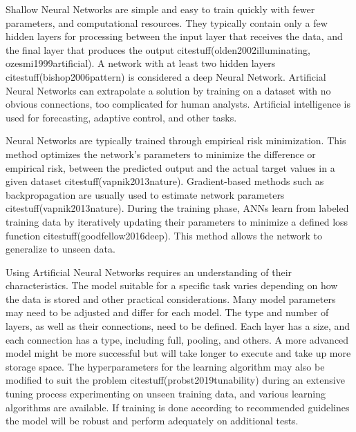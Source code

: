 \documentclass[preprint,12pt]{elsarticle}
\begin{document}
Shallow Neural Networks are simple and easy to train quickly with fewer parameters, and computational resources. They typically contain only a few hidden layers for processing between the input layer that receives the data, and the final layer that produces the output citestuff(olden2002illuminating, ozesmi1999artificial).  A network with at least two hidden layers citestuff(bishop2006pattern) is considered a deep Neural Network. Artificial Neural Networks can extrapolate a solution by training on a dataset with no obvious connections, too complicated for human analysts. Artificial intelligence is used for forecasting, adaptive control, and other tasks.

Neural Networks are typically trained through empirical risk minimization. This method optimizes the network's parameters to minimize the difference or empirical risk, between the predicted output and the actual target values in a given dataset citestuff(vapnik2013nature). Gradient-based methods such as backpropagation are usually used to estimate network parameters  citestuff(vapnik2013nature). During the training phase, ANNs learn from labeled training data by iteratively updating their parameters to minimize a defined loss function citestuff(goodfellow2016deep). This method allows the network to generalize to unseen data.

Using Artificial Neural Networks requires an understanding of their characteristics. The model suitable for a specific task varies depending on how the data is stored and other practical considerations. Many model parameters may need to be adjusted and differ for each model. The type and number of layers, as well as their connections, need to be defined. Each layer has a size, and each connection has a type, including full, pooling, and others. A more advanced model might be more successful but will take longer to execute and take up more storage space. The hyperparameters for the learning algorithm may also be modified to suit the problem citestuff(probst2019tunability) during an extensive tuning process experimenting on unseen training data, and various learning algorithms are available. If training is done according to recommended guidelines the model will be robust and perform adequately on additional tests.
\end{document}
